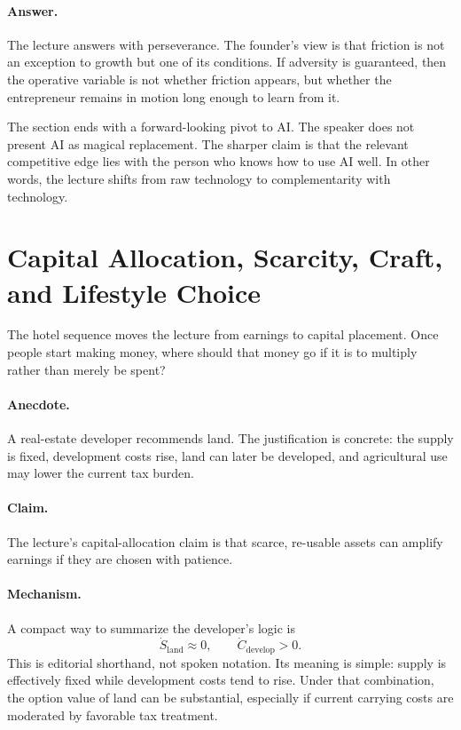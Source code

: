 \paragraph{Answer.}
The lecture answers with perseverance. The founder's view is that friction is not an exception to growth but one of its conditions. If adversity is guaranteed, then the operative variable is not whether friction appears, but whether the entrepreneur remains in motion long enough to learn from it.

The section ends with a forward-looking pivot to AI. The speaker does not present AI as magical replacement. The sharper claim is that the relevant competitive edge lies with the person who knows how to use AI well. In other words, the lecture shifts from raw technology to complementarity with technology.

\section{Capital Allocation, Scarcity, Craft, and Lifestyle Choice}

The hotel sequence moves the lecture from earnings to capital placement. Once people start making money, where should that money go if it is to multiply rather than merely be spent?

\paragraph{Anecdote.}
A real-estate developer recommends land. The justification is concrete: the supply is fixed, development costs rise, land can later be developed, and agricultural use may lower the current tax burden.

\paragraph{Claim.}
The lecture's capital-allocation claim is that scarce, re-usable assets can amplify earnings if they are chosen with patience.

\paragraph{Mechanism.}
A compact way to summarize the developer's logic is
\begin{equation}
\dot S_{\mathrm{land}} \approx 0,
\qquad
\dot C_{\mathrm{develop}} > 0.
\end{equation}
This is editorial shorthand, not spoken notation. Its meaning is simple: supply is effectively fixed while development costs tend to rise. Under that combination, the option value of land can be substantial, especially if current carrying costs are moderated by favorable tax treatment.


